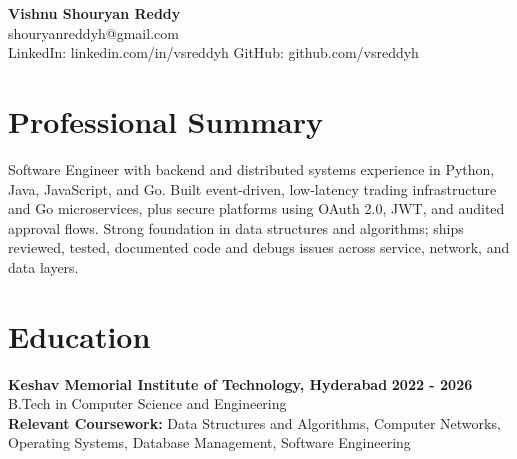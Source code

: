 \documentclass[a4paper,11pt]{article}
\newcommand{\resumeSubheading}[4]{%
  \textbf{#1} \hfill \textbf{#2} \\
{#3} \hfill {#4}
}
\begin{document}
\pagestyle{empty}
\raggedbottom
\addtolength{\textheight}{2\baselineskip}
\small

\begin{center}
  {\LARGE \textbf{Vishnu Shouryan Reddy}}\\[0.3em]
  shouryanreddyh@gmail.com \\[0.3em]
  LinkedIn: linkedin.com/in/vsreddyh \textbar{} GitHub: github.com/vsreddyh
\end{center}
\vspace{-0.8em}

\section*{Professional Summary}

Software Engineer with backend and distributed systems experience in Python, Java, JavaScript, and Go. Built event-driven, low-latency trading infrastructure and Go microservices, plus secure platforms using OAuth 2.0, JWT, and audited approval flows. Strong foundation in data structures and algorithms; ships reviewed, tested, documented code and debugs issues across service, network, and data layers.

\section*{Education}

\resumeSubheading
{Keshav Memorial Institute of Technology, Hyderabad}{2022 - 2026}
{B.Tech in Computer Science and Engineering}{} \\
\textbf{Relevant Coursework:} Data Structures and Algorithms, Computer Networks, Operating Systems, Database Management, Software Engineering


\end{document}
